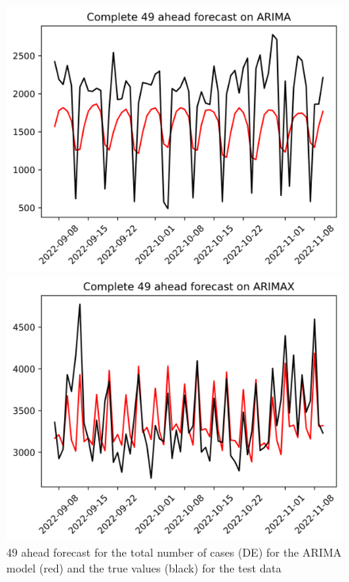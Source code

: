 \begin{figure}

\begin{minipage}{.32\textwidth}
  \centering
  \includegraphics[width=\linewidth]{pics/49_ah/DE_Complete_49_ahead_ARIMA.png}
  \caption{49 ahead forecast for the total number of cases (DE) for the ARIMA model (red) and the true values (black) for the test data}
  \label{fig:tot_cases_fc_49_ARIMA_DE}
\end{minipage}
\begin{minipage}{.32\textwidth}
  \centering
  \includegraphics[width=\linewidth]{pics/49_ah/Complete_49_ahead_ARIMAX.png}

\end{minipage}
\end{figure}
